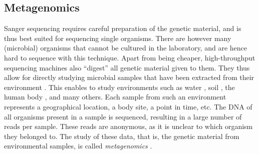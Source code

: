 

\subsection{Metagenomics}
\label{ch:Foundations:sec:SequenceAnalysis:sub:Metagenomics}

Sanger sequencing requires careful preparation of the genetic material,
and is thus best suited for sequencing single organisms.
There are however many (microbial) organisms that cannot be cultured in the laboratory,
and are hence hard to sequence with this technique.
Apart from being cheaper, high-throughput sequencing machines also ``digest'' all genetic material given to them.
They thus allow for directly studying microbial samples
that have been extracted from their environment \citep{Morgan2010,Edwards2013,Sunagawa2013a}.
This enables to study environments such as
water \cite{Karsenti2011,Giner2016,Gran-Stadniczenko2017},
soil \cite{Dupont2016,Mahe2017},
the human body \cite{Huttenhower2012,Methe2012,Matsen2015,Wang2015},
and many others.
Each sample from such an environment represents a geographical location, a body site, a point in time, etc.
The \ac{DNA} of all organisms present in a sample is sequenced,
resulting in a large number of reads per sample.
These reads are anonymous, as it is unclear to which organism they belonged to.
The study of these data, that is, the genetic material from environmental samples,
is called \emph{metagenomics} \cite{Oulas2015}.


